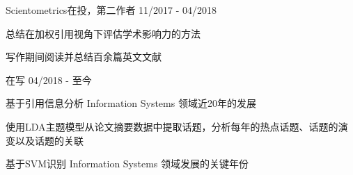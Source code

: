 
\begin{cventries}

\cvexperience
{ Scientometrics在投，第二作者}
{11/2017 - 04/2018}
{
    \begin{cvitems}
    \item {总结在加权引用视角下评估学术影响力的方法}
    \item {写作期间阅读并总结百余篇英文文献}
    \end{cvitems}
}

\cvexperience
{ 在写}
{04/2018 - 至今}
{
    \begin{cvitems}
    \item {基于引用信息分析 Information Systems 领域近20年的发展}
    \item {使用LDA主题模型从论文摘要数据中提取话题，分析每年的热点话题、话题的演变以及话题的关联}
    \item {基于SVM识别 Information Systems 领域发展的关键年份}
    \end{cvitems}
}


\end{cventries}